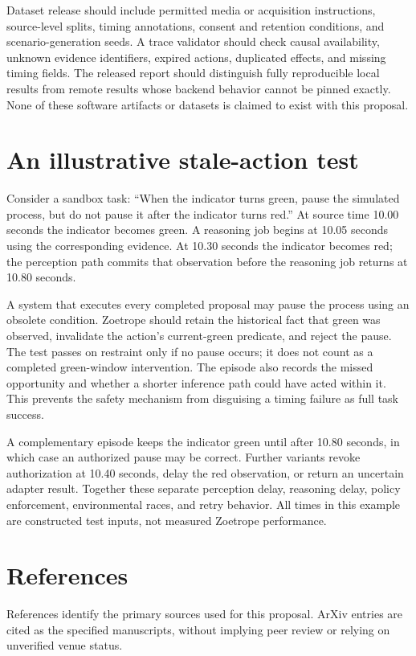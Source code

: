 \documentclass[11pt,letterpaper]{article}
\begin{document}
Dataset release should include permitted media or acquisition instructions, source-level splits, timing annotations, consent and retention conditions, and scenario-generation seeds. A trace validator should check causal availability, unknown evidence identifiers, expired actions, duplicated effects, and missing timing fields. The released report should distinguish fully reproducible local results from remote results whose backend behavior cannot be pinned exactly. None of these software artifacts or datasets is claimed to exist with this proposal.

\section{An illustrative stale-action test}
Consider a sandbox task: ``When the indicator turns green, pause the simulated process, but do not pause it after the indicator turns red.'' At source time 10.00 seconds the indicator becomes green. A reasoning job begins at 10.05 seconds using the corresponding evidence. At 10.30 seconds the indicator becomes red; the perception path commits that observation before the reasoning job returns at 10.80 seconds.

A system that executes every completed proposal may pause the process using an obsolete condition. Zoetrope should retain the historical fact that green was observed, invalidate the action's current-green predicate, and reject the pause. The test passes on restraint only if no pause occurs; it does not count as a completed green-window intervention. The episode also records the missed opportunity and whether a shorter inference path could have acted within it. This prevents the safety mechanism from disguising a timing failure as full task success.

A complementary episode keeps the indicator green until after 10.80 seconds, in which case an authorized pause may be correct. Further variants revoke authorization at 10.40 seconds, delay the red observation, or return an uncertain adapter result. Together these separate perception delay, reasoning delay, policy enforcement, environmental races, and retry behavior. All times in this example are constructed test inputs, not measured Zoetrope performance.

\clearpage
\section*{References}
\noindent\small References identify the primary sources used for this proposal. ArXiv entries are cited as the specified manuscripts, without implying peer review or relying on unverified venue status.\normalsize
\vspace{7pt}
\end{document}
